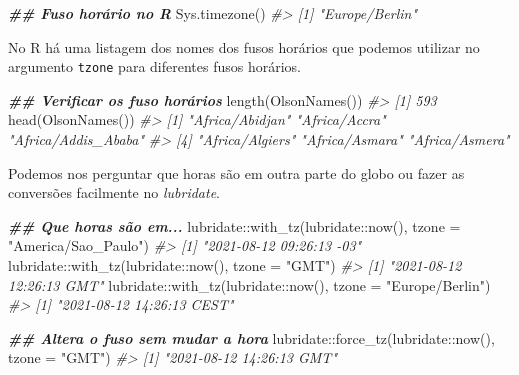 \documentclass[
]{book}
\newenvironment{Shaded}{\begin{snugshade}}{\end{snugshade}}
\newcommand{\AttributeTok}[1]{\textcolor[rgb]{0.61,0.61,0.61}{#1}}
\newcommand{\CommentTok}[1]{\textcolor[rgb]{0.37,0.37,0.37}{\textit{#1}}}
\newcommand{\DocumentationTok}[1]{\textcolor[rgb]{0.37,0.37,0.37}{\textbf{\textit{#1}}}}
\newcommand{\FunctionTok}[1]{\textcolor[rgb]{0,0,0}{#1}}
\newcommand{\NormalTok}[1]{#1}
\newcommand{\SpecialCharTok}[1]{\textcolor[rgb]{0,0,0}{#1}}
\newcommand{\StringTok}[1]{\textcolor[rgb]{0.5,0.5,0.5}{#1}}
\begin{document}
\begin{Shaded}
\begin{Highlighting}[]
\DocumentationTok{\#\# Fuso horário no R}
\FunctionTok{Sys.timezone}\NormalTok{()}
\CommentTok{\#\textgreater{} [1] "Europe/Berlin"}
\end{Highlighting}
\end{Shaded}

No R há uma listagem dos nomes dos fusos horários que podemos utilizar no argumento \texttt{tzone} para diferentes fusos horários.

\begin{Shaded}
\begin{Highlighting}[]
\DocumentationTok{\#\# Verificar os fuso horários}
\FunctionTok{length}\NormalTok{(}\FunctionTok{OlsonNames}\NormalTok{())}
\CommentTok{\#\textgreater{} [1] 593}
\FunctionTok{head}\NormalTok{(}\FunctionTok{OlsonNames}\NormalTok{())}
\CommentTok{\#\textgreater{} [1] "Africa/Abidjan"     "Africa/Accra"       "Africa/Addis\_Ababa"}
\CommentTok{\#\textgreater{} [4] "Africa/Algiers"     "Africa/Asmara"      "Africa/Asmera"}
\end{Highlighting}
\end{Shaded}

Podemos nos perguntar que horas são em outra parte do globo ou fazer as conversões facilmente no \emph{lubridate}.

\begin{Shaded}
\begin{Highlighting}[]
\DocumentationTok{\#\# Que horas são em...}
\NormalTok{lubridate}\SpecialCharTok{::}\FunctionTok{with\_tz}\NormalTok{(lubridate}\SpecialCharTok{::}\FunctionTok{now}\NormalTok{(), }\AttributeTok{tzone =} \StringTok{"America/Sao\_Paulo"}\NormalTok{)}
\CommentTok{\#\textgreater{} [1] "2021{-}08{-}12 09:26:13 {-}03"}
\NormalTok{lubridate}\SpecialCharTok{::}\FunctionTok{with\_tz}\NormalTok{(lubridate}\SpecialCharTok{::}\FunctionTok{now}\NormalTok{(), }\AttributeTok{tzone =} \StringTok{"GMT"}\NormalTok{)}
\CommentTok{\#\textgreater{} [1] "2021{-}08{-}12 12:26:13 GMT"}
\NormalTok{lubridate}\SpecialCharTok{::}\FunctionTok{with\_tz}\NormalTok{(lubridate}\SpecialCharTok{::}\FunctionTok{now}\NormalTok{(), }\AttributeTok{tzone =} \StringTok{"Europe/Berlin"}\NormalTok{)}
\CommentTok{\#\textgreater{} [1] "2021{-}08{-}12 14:26:13 CEST"}

\DocumentationTok{\#\# Altera o fuso sem mudar a hora}
\NormalTok{lubridate}\SpecialCharTok{::}\FunctionTok{force\_tz}\NormalTok{(lubridate}\SpecialCharTok{::}\FunctionTok{now}\NormalTok{(), }\AttributeTok{tzone =} \StringTok{"GMT"}\NormalTok{)}
\CommentTok{\#\textgreater{} [1] "2021{-}08{-}12 14:26:13 GMT"}
\end{Highlighting}
\end{Shaded}
\end{document}
